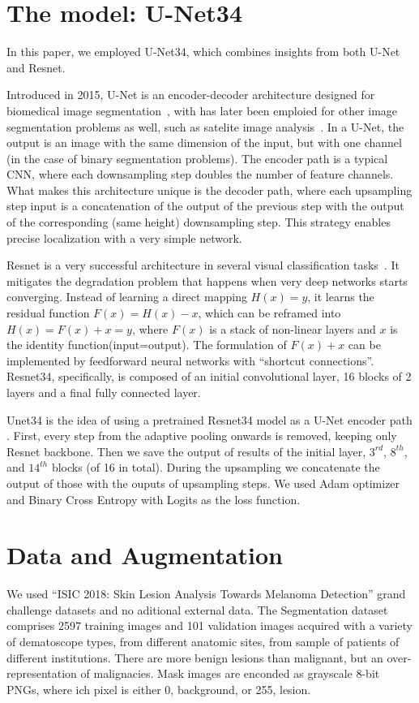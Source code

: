 \documentclass{article}
\begin{document}
\section{The model: U-Net34}
In this paper, we employed U-Net34, which combines insights from both
U-Net and Resnet.

Introduced in 2015, U-Net is an encoder-decoder architecture designed for biomedical image segmentation~\cite{ronneberger_etal_UNet_miccai2015},
with has later been emploied for other image segmentation problems
as well, such as satelite image analysis~\cite{iglovikov}.
In a U-Net, the output is an image with the same dimension of the input,
but with one channel (in the case of binary segmentation problems).
The encoder path is a typical CNN, where each downsampling step doubles
the number of feature channels.
What makes this architecture unique is the decoder path, where each
upsampling step input is a concatenation of the output of the previous
step with the output of the corresponding (same height) downsampling step.
This strategy enables precise localization with a very simple network. 

Resnet is a very successful architecture in several visual classification
tasks~\cite{he}.
It mitigates the degradation problem that happens when very deep
networks starts converging.
Instead of learning a direct mapping $H(x) = y$, it learns the residual
function  $F(x) = H(x)-x$, which can be reframed into
$H(x) = F(x)+x = y$, where $F(x)$ is a stack of non-linear layers and
$x$ is the identity function(input=output).
The formulation of $F(x)+x$ can be implemented by feedforward neural
networks with ``shortcut connections''.
Resnet34, specifically, is composed of an initial convolutional layer,
16 blocks of 2 layers and a final fully connected layer.

Unet34 is the idea of using a pretrained Resnet34 model as a
U-Net encoder path \cite{fastai}. First, every step from the adaptive
pooling onwards is removed, keeping only Resnet backbone.
Then we save the output of results of the initial layer, $3^{rd}$, $8^{th}$,
and $14^{th}$ blocks (of 16 in total). During the upsampling we concatenate the output of those with the ouputs of upsampling steps. We used Adam optimizer and Binary Cross Entropy with Logits as the loss function.

\section{Data and Augmentation}
We used ``ISIC 2018: Skin Lesion Analysis Towards Melanoma Detection'' grand challenge datasets \cite{codella, ham} and no aditional external data. The Segmentation dataset comprises 2597 training images and 101 validation images acquired with a variety of dematoscope types, from different anatomic sites, from sample of patients of different institutions. There are more benign lesions than malignant, but an over-representation of malignacies. Mask images are enconded as grayscale 8-bit PNGs, where ich pixel is either 0, background, or 255, lesion. 
\end{document}
